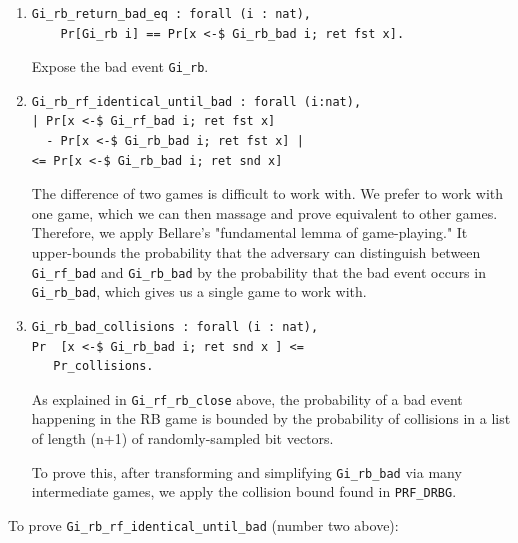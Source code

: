 \documentclass[12pt,lot, lof]{puthesis}
\newcommand{\li} {\lstinline}
\begin{document}
{\begin{enumerate}
  Expose the bad event in \li|Gi_rf|. The bad event is that there are duplicates in the inputs to the $i$th oracle call.

\par
\item \begin{lstlisting}
Gi_rb_return_bad_eq : forall (i : nat),
    Pr[Gi_rb i] == Pr[x <-$ Gi_rb_bad i; ret fst x].
\end{lstlisting}

Expose the bad event \li|Gi_rb|.

\par
\item \begin{lstlisting}
Gi_rb_rf_identical_until_bad : forall (i:nat), 
| Pr[x <-$ Gi_rf_bad i; ret fst x] 
  - Pr[x <-$ Gi_rb_bad i; ret fst x] | 
<= Pr[x <-$ Gi_rb_bad i; ret snd x]
\end{lstlisting}                                

The difference of two games is difficult to work with. We prefer to work with one game, which we can then massage and prove equivalent to other games. Therefore, we apply Bellare's "fundamental lemma of game-playing." It upper-bounds the probability that the adversary can distinguish between \li|Gi_rf_bad| and \li|Gi_rb_bad| by the probability that the bad event occurs in \li|Gi_rb_bad|, which gives us a single game to work with.

                                              
\par
\item \begin{lstlisting}
Gi_rb_bad_collisions : forall (i : nat),
Pr  [x <-$ Gi_rb_bad i; ret snd x ] <= 
   Pr_collisions.
\end{lstlisting}

As explained in \li|Gi_rf_rb_close| above, the probability of a bad event happening in the RB game is bounded by the probability of collisions in a list of length (n+1) of randomly-sampled bit vectors. 

To prove this, after transforming and simplifying \li|Gi_rb_bad| via many intermediate games, we apply the collision bound found in \li|PRF_DRBG|.

\end{enumerate} 

To prove \lstinline|Gi_rb_rf_identical_until_bad| (number two above):

}
\end{document}
